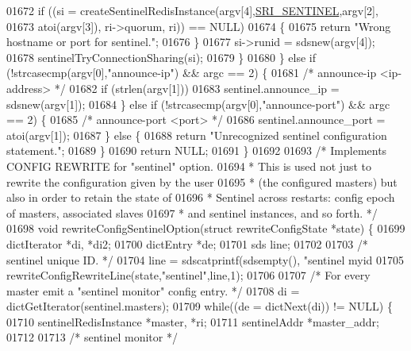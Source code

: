 \begin{DoxyCode}
{{{{{{{{{{{{{{{{{{01672             \textcolor{keywordflow}{if} ((si = createSentinelRedisInstance(argv[4],\hyperlink{sentinel_8c_a8ed55207b2af5d2dd314c951ef253f64}{SRI\_SENTINEL},argv[2],
01673                         atoi(argv[3]), ri->quorum, ri)) == NULL)
01674             \{
01675                 \textcolor{keywordflow}{return} \textcolor{stringliteral}{"Wrong hostname or port for sentinel."};
01676             \}
01677             si->runid = sdsnew(argv[4]);
01678             sentinelTryConnectionSharing(si);
01679         \}
01680     \} \textcolor{keywordflow}{else} \textcolor{keywordflow}{if} (!strcasecmp(argv[0],\textcolor{stringliteral}{"announce-ip"}) && argc == 2) \{
01681         \textcolor{comment}{/* announce-ip <ip-address> */}
01682         \textcolor{keywordflow}{if} (strlen(argv[1]))
01683             sentinel.announce\_ip = sdsnew(argv[1]);
01684     \} \textcolor{keywordflow}{else} \textcolor{keywordflow}{if} (!strcasecmp(argv[0],\textcolor{stringliteral}{"announce-port"}) && argc == 2) \{
01685         \textcolor{comment}{/* announce-port <port> */}
01686         sentinel.announce\_port = atoi(argv[1]);
01687     \} \textcolor{keywordflow}{else} \{
01688         \textcolor{keywordflow}{return} \textcolor{stringliteral}{"Unrecognized sentinel configuration statement."};
01689     \}
01690     \textcolor{keywordflow}{return} NULL;
01691 \}
01692 
01693 \textcolor{comment}{/* Implements CONFIG REWRITE for "sentinel" option.}
01694 \textcolor{comment}{ * This is used not just to rewrite the configuration given by the user}
01695 \textcolor{comment}{ * (the configured masters) but also in order to retain the state of}
01696 \textcolor{comment}{ * Sentinel across restarts: config epoch of masters, associated slaves}
01697 \textcolor{comment}{ * and sentinel instances, and so forth. */}
01698 \textcolor{keywordtype}{void} rewriteConfigSentinelOption(\textcolor{keyword}{struct} rewriteConfigState *state) \{
01699     dictIterator *di, *di2;
01700     dictEntry *de;
01701     sds line;
01702 
01703     \textcolor{comment}{/* sentinel unique ID. */}
01704     line = sdscatprintf(sdsempty(), \textcolor{stringliteral}{"sentinel myid %
01705     rewriteConfigRewriteLine(state,\textcolor{stringliteral}{"sentinel"},line,1);
01706 
01707     \textcolor{comment}{/* For every master emit a "sentinel monitor" config entry. */}
01708     di = dictGetIterator(sentinel.masters);
01709     \textcolor{keywordflow}{while}((de = dictNext(di)) != NULL) \{
01710         sentinelRedisInstance *master, *ri;
01711         sentinelAddr *master\_addr;
01712 
01713         \textcolor{comment}{/* sentinel monitor */}
}}}}}}}}}}}}}}}}}}}
\end{DoxyCode}
